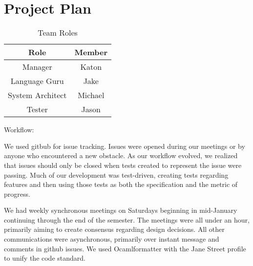 \section{Project Plan}

\begin{table}[]
	\caption{Team Roles}
    \centering
    \begin{tabular}{|c|c|}
    	\hline
         Role & Member \\\hline
         Manager & Katon \\
         Language Guru & Jake \\
         System Architect & Michael\\
         Tester & Jason\\\hline
    \end{tabular}
\end{table}

Workflow:

We used gitbub for issue tracking. Issues were opened during our meetings or by anyone who encountered a new obstacle. As our workflow evolved, we realized that issues should only be closed when tests created to represent the issue were passing. Much of our development was test-driven, creating tests regarding features and then using those tests as both the specification and the metric of progress.

We had weekly synchronous meetings on Saturdays beginning in mid-January continuing through the end of the semester. The meetings were all under an hour, primarily aiming to create consensus regarding design decisions. All other communications were asynchronous, primarily over instant message and comments in github issues.
We used Ocamlformatter with the Jane Street profile to unify the code standard.



